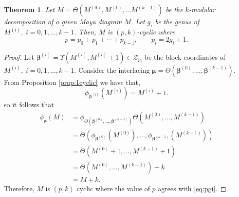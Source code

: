 \documentclass[10pt]{amsart}
\newtheorem{thm}{Theorem}[section]
\theoremstyle{definition}
\numberwithin{equation}{section}
\numberwithin{figure}{section}
\newcommand{\Z}{\mathbb{Z}}
\newcommand{\bbeta}{{\boldsymbol{\beta}}}
\newcommand{\bmu}{{\boldsymbol{\mu}}}
\newcommand{\cM}{\mathcal{M}}
\newcommand{\cZ}{\mathcal{Z}}
\begin{document}
\begin{thm}
  \label{thm:Mp}
  Let $M=\Theta\left(M^{(0)}, M^{(1)},\ldots M^{(k-1)}\right)$ be the $k$-modular decomposition of a given Maya diagram $M$.  Let $g_i$ be the genus
  of $M^{(i)},\; i=0,1,\ldots, k-1$.  Then, $M$ is $(p,k)$-cyclic where
  \begin{equation}
    \label{eq:pgi}
    p = p_0+p_1+\cdots + p_{k-1},\qquad p_i = 2g_i + 1.
  \end{equation}
\end{thm}
\begin{proof}
  Let $\bbeta^{(i)}=\Upsilon\left(M^{(i)},M^{(i)}+1\right) \in \cZ_{p_i}$ be the block
  coordinates of $M^{(i)},\; i=0,1,\ldots, k-1$.  Consider the interlacing
  $\bmu = \Theta\left(\bbeta^{(0)}, \ldots , \bbeta^{(k-1)}\right)$.  From
  Proposition \ref{prop:1cyclic} we have that,
  \[ \phi_{\bbeta^{(i)}}\left( M^{(i)}\right)= M^{(i)} +1.\]
  so it follows that
  \begin{align*}
    \phi_{\bmu}(M)&= \phi_{\Theta\left(\bbeta^{(0)}, \ldots , \bbeta^{(k-1)}\right)}\Theta\left( M^{(0)} , \ldots ,
                  M^{(k-1)}\right) \\   
    &= \Theta\left( \phi_{\bbeta^{(0)}}(M^{(0)}) , \ldots ,
                    \phi_{\bbeta^{(k-1)}}(M^{(k-1)})\right) \\
                  &= \Theta\left(M^{(0)}+1 , \ldots , M^{(k-1)} + 1\right) \\
                  &= \Theta\left(M^{(0)}, \ldots , M^{(k-1)}\right) + k \\
                  &= M+k.
  \end{align*}
  Therefore, $M$ is $(p,k)$ cyclic where the value of $p$ agrees with
  \eqref{eq:pgi}.
\end{proof}
\end{document}
